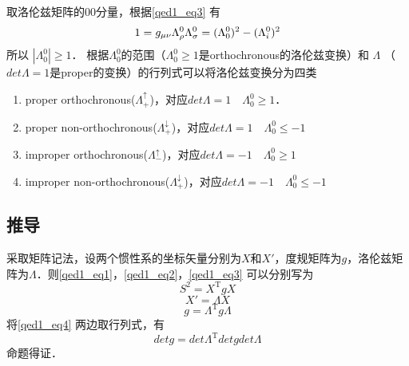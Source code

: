 取洛伦兹矩阵的00分量，根据\autoref{qed1_eq3} 有
\begin{equation}
1=g_{\mu \nu} \Lambda_{\rho}^{0} \Lambda_{\sigma}^{0}= (\Lambda_{0}^{0})^2- (\Lambda_{i}^{0})^2\\
\end{equation}
所以 $\left|\Lambda_{0}^{0} \right|\geqslant1$． 根据$\Lambda_{0}^{0}$的范围（$\Lambda_{0}^{0}\geqslant1$是orthochronous的洛伦兹变换）和 $\Lambda$ （$det\Lambda=1$是proper的变换）的行列式可以将洛伦兹变换分为四类
\begin{enumerate}
\item proper orthochronous($\Lambda_{+}^{\uparrow}$)，对应$det\Lambda=1\quad \Lambda_{0}^{0}\geqslant1$．
\item proper non-orthochronous($\Lambda_{+}^{\downarrow}$)，对应$det\Lambda=1\quad \Lambda_{0}^{0}\leqslant-1$
\item improper orthochronous($\Lambda_{-}^{\uparrow}$)，对应$det\Lambda=-1 \quad\Lambda_{0}^{0}\geqslant1$
\item improper non-orthochronous($\Lambda_{+}^{\downarrow}$)，对应$det\Lambda=-1 \quad\Lambda_{0}^{0}\leqslant-1$
\end{enumerate}
\subsection{推导}
采取矩阵记法，设两个惯性系的坐标矢量分别为$X$和$X'$，度规矩阵为$g$，洛伦兹矩阵为$\Lambda$．则\autoref{qed1_eq1}，\autoref{qed1_eq2}，\autoref{qed1_eq3} 可以分别写为
\begin{equation}
S^{2}=X^{\mathrm{T}} g X
\end{equation}
\begin{equation}
X'=\Lambda X
\end{equation}
\begin{equation}\label{qed1_eq4}
g=\Lambda^{\mathrm{T}} g \Lambda
\end{equation}
将\autoref{qed1_eq4} 两边取行列式，有
\begin{equation}
detg=det\Lambda^{\mathrm{T}} detg det\Lambda
\end{equation}
命题得证．
